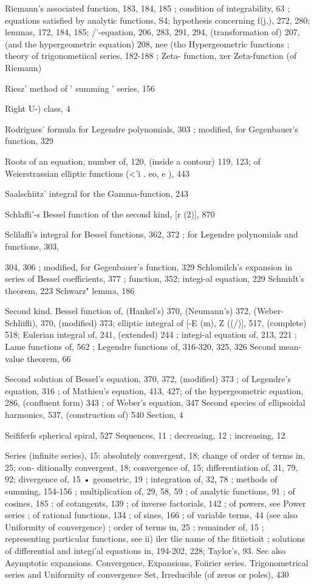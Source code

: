 %
%
Riemann's associated function, 183, 184, 185 ; condition of integrability, 63 ; equations satisfied
by analytic functions, S4; hypothesis concerning f(j,), 272, 280; lemmas, 172, 184, 185;
/'-equation, 206, 283, 291, 294, (transformation of) 207, (and the hypergeometric equation)
208, nee (tho Hypergeometric functions ; theory of trigonometiical series, 182-188 ; Zeta-
function, xer Zeta-function (of Riemann)

Riesz' method of ' summing ' series, 156

Right  U-) class, 4

Rodrigues' formula for Legendre polynomials, 303 ; modified, for Gegenbauer's function, 329

Roots of an equation, number of, 120, (inside a contour) 119, 123; of Weierstrassian elliptic
functions (<'i . eo, e ), 443

Saalschiitz' integral for the Gamma-function, 243

Schlafli'-s Bessel function of the second kind, [r  (2)], 870

Sclilafli's integral for Bessel functions, 362, 372 ; for Legendre polynomials and functions, 303,

304, 306 ; modified, for Gegenbauer's function, 329
Schlomilch's expansion in series of Bessel coefficients, 377 ; function, 352; integi-al equation, 229
Schmidt's theorem, 223
Schwarz" lemma, 186

Second kind. Bessel function of, (Hankel's) 370, (Neumann's) 372, (Weber-Schliifli), 370,
(modified) 373; elliptic integral of [-E (m), Z ((/)], 517, (complete) 518; Eulerian integral of,
241, (extended) 244 ; integi-al equation of, 213, 221 ; Lame functions of, 562 ; Legendre
functions of, 316-320, 325, 326
Second mean-value theorem, 66

Second solution of Bessel's equation, 370, 372, (modified) 373 ; of Legendre's equation, 316 ; of
Mathieu's equation, 413, 427; of the hypergeometric equation, 286, (confluent form) 343 ; of
Weber's equation, 347
Second species of ellipsoidal harmonics, 537, (construction of) 540
Section, 4

Seififerfs spherical spiral, 527
Sequences, 11 ; decreasing, 12 ; increasing, 12

Series (infinite series), 15: absolutely convergent, 18; change of order of terms in, 25; con-
ditionally convergent, 18; convergence of, 15; differentiation of, 31, 79, 92; divergence of,
15 • geometric, 19 ; integration of, 32, 78 ; methods of summing, 154-156 ; multiplication
of, 29, 58, 59 ; of analytic functions, 91 ; of cosines, 185 ; of cotangents, 139 ; of inverse
factorials, 142 ; of powers, see Power series ; of rational functions, 134 ; of sines, 166 ; of
variable terms, 44 (see also Uniformity of convergence) ; order of terms in, 25 ; remainder of,
15 ; representing particular functions, see ii) iler tlie name of the fitiietioit ; solutions of
differential and integi'al equations in, 194-202, 228; Taylor's, 93. Sec also Asymptotic
expansions. Convergence, Expansions, Foiirier series. Trigonometrical series and Uniformity
of convergence
Set, Irreducible (of zeros or poles), 430

